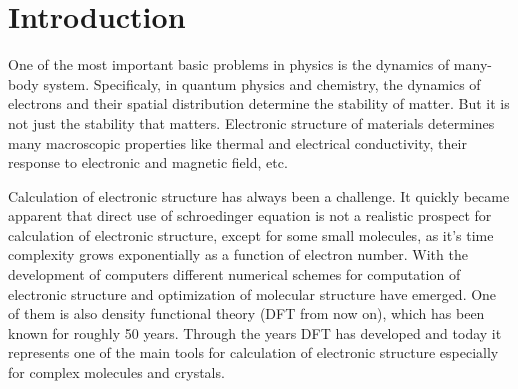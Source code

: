 \documentclass[openany, longbibliography,slovene,a4paper,12pt]{article}
\begin{document}
\section{Introduction}
One of the most important basic problems in physics is the dynamics of many-body system. Specificaly, in quantum physics and chemistry, the dynamics of electrons and their spatial distribution determine the stability of matter. But it is not just the stability that matters. Electronic structure of materials determines many macroscopic properties like thermal and electrical conductivity, their response to electronic and magnetic field, etc.

Calculation of electronic structure has always been a challenge. It quickly became apparent that direct use of schroedinger equation is not a realistic prospect for calculation of electronic structure, except for some small molecules, as it's time complexity grows exponentially as a function of electron number. With the development of computers different numerical schemes for computation of electronic structure and optimization of molecular structure have emerged. One of them is also density functional theory (DFT from now on), which has been known for roughly 50 years. Through the years DFT has developed and today it represents one of the main tools for calculation of electronic structure especially for complex molecules and crystals.
\end{document}
